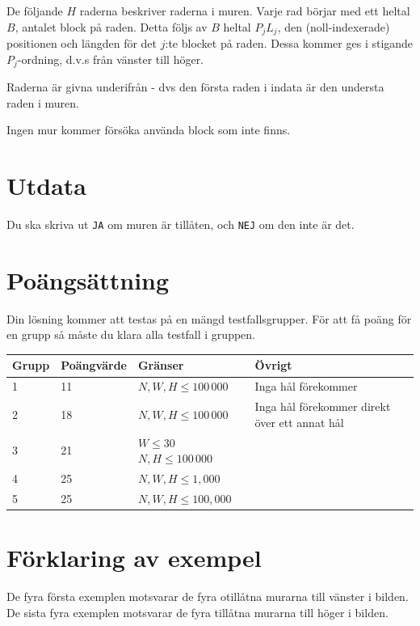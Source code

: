 De följande $H$ raderna beskriver raderna i muren.
Varje rad börjar med ett heltal $B$, antalet block på raden.
Detta följs av $B$ heltal $P_j L_j$, den (noll-indexerade) positionen och längden för det $j$:te blocket på raden. Dessa kommer ges i stigande $P_j$-ordning, d.v.s från vänster till höger.

Raderna är givna underifrån - dvs den första raden i indata är den understa raden i muren.

Ingen mur kommer försöka använda block som inte finns.

\section*{Utdata}
Du ska skriva ut \texttt{JA} om muren är tillåten, och \texttt{NEJ} om den inte är det.

\section*{Poängsättning}
Din lösning kommer att testas på en mängd testfallsgrupper. För att få poäng för en grupp
så måste du klara alla testfall i gruppen.

\begin{tabular}{| l | l | l | l |}
\hline
Grupp & Poängvärde & Gränser & Övrigt \\ \hline
1     & 11         & $N, W, H \le 100\,000$ & Inga hål förekommer \\ \hline
2     & 18         & $N, W, H \le 100\,000$ & Inga hål förekommer direkt över ett annat hål \\ \hline
3     & 21         & $W \le 30$ $N, H \le 100\,000$ \\ \hline
4     & 25         & $N, W, H \le 1,000$ & \\ \hline
5     & 25         & $N, W, H \le 100,000$ & \\ \hline
\end{tabular}

\section*{Förklaring av exempel}
De fyra första exemplen motsvarar de fyra otillåtna murarna till vänster i bilden.
De sista fyra exemplen motsvarar de fyra tillåtna murarna till höger i bilden.
